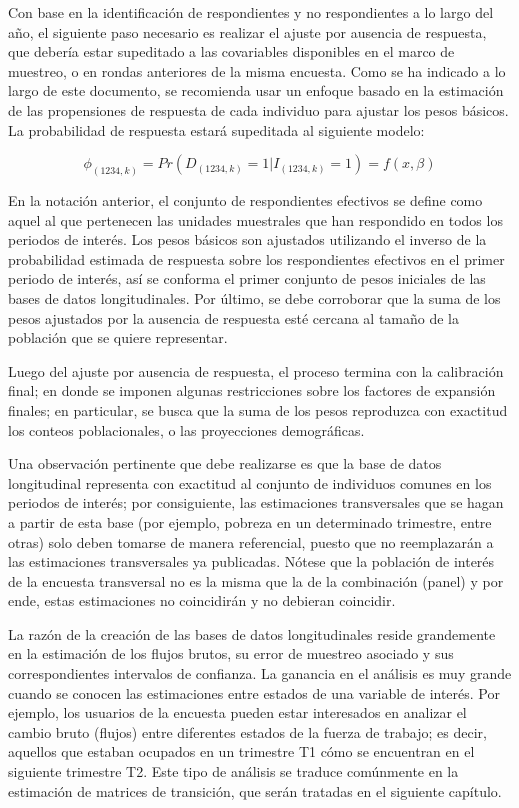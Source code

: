 \documentclass[
  12pt,
  spanish,
]{book}
\begin{document}
Con base en la identificación de respondientes y no respondientes a lo largo del año, el siguiente paso necesario es realizar el ajuste por ausencia de respuesta, que debería estar supeditado a las covariables disponibles en el marco de muestreo, o en rondas anteriores de la misma encuesta. Como se ha indicado a lo largo de este documento, se recomienda usar un enfoque basado en la estimación de las propensiones de respuesta de cada individuo para ajustar los pesos básicos. La probabilidad de respuesta estará supeditada al siguiente modelo:

\[
\phi_{(1234,k)}=Pr(D_{(1234,k)}=1|I_{(1234,k)}=1)=f(x,\beta)
\]

En la notación anterior, el conjunto de respondientes efectivos se define como aquel al que pertenecen las unidades muestrales que han respondido en todos los periodos de interés. Los pesos básicos son ajustados utilizando el inverso de la probabilidad estimada de respuesta sobre los respondientes efectivos en el primer periodo de interés, así se conforma el primer conjunto de pesos iniciales de las bases de datos longitudinales. Por último, se debe corroborar que la suma de los pesos ajustados por la ausencia de respuesta esté cercana al tamaño de la población que se quiere representar.

Luego del ajuste por ausencia de respuesta, el proceso termina con la calibración final; en donde se imponen algunas restricciones sobre los factores de expansión finales; en particular, se busca que la suma de los pesos reproduzca con exactitud los conteos poblacionales, o las proyecciones demográficas.

Una observación pertinente que debe realizarse es que la base de datos longitudinal representa con exactitud al conjunto de individuos comunes en los periodos de interés; por consiguiente, las estimaciones transversales que se hagan a partir de esta base (por ejemplo, pobreza en un determinado trimestre, entre otras) solo deben tomarse de manera referencial, puesto que no reemplazarán a las estimaciones transversales ya publicadas. Nótese que la población de interés de la encuesta transversal no es la misma que la de la combinación (panel) y por ende, estas estimaciones no coincidirán y no debieran coincidir.

La razón de la creación de las bases de datos longitudinales reside grandemente en la estimación de los flujos brutos, su error de muestreo asociado y sus correspondientes intervalos de confianza. La ganancia en el análisis es muy grande cuando se conocen las estimaciones entre estados de una variable de interés. Por ejemplo, los usuarios de la encuesta pueden estar interesados en analizar el cambio bruto (flujos) entre diferentes estados de la fuerza de trabajo; es decir, aquellos que estaban ocupados en un trimestre T1 cómo se encuentran en el siguiente trimestre T2. Este tipo de análisis se traduce comúnmente en la estimación de matrices de transición, que serán tratadas en el siguiente capítulo.
\end{document}
